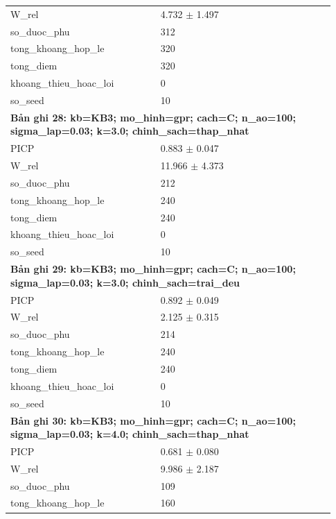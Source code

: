 \begin{longtable}{p{0.43\linewidth}p{0.50\linewidth}}
W\_\allowbreak rel & 4.732 $\pm$ 1.497 \\
so\_\allowbreak duoc\_\allowbreak phu & 312 \\
tong\_\allowbreak khoang\_\allowbreak hop\_\allowbreak le & 320 \\
tong\_\allowbreak diem & 320 \\
khoang\_\allowbreak thieu\_\allowbreak hoac\_\allowbreak loi & 0 \\
so\_\allowbreak seed & 10 \\
\midrule
\multicolumn{2}{p{0.95\linewidth}}{\textbf{Bản ghi 28: kb=KB3; mo\_hinh=gpr; cach=C; n\_ao=100; sigma\_lap=0.03; k=3.0; chinh\_sach=thap\_nhat}} \\
PICP & 0.883 $\pm$ 0.047 \\
W\_\allowbreak rel & 11.966 $\pm$ 4.373 \\
so\_\allowbreak duoc\_\allowbreak phu & 212 \\
tong\_\allowbreak khoang\_\allowbreak hop\_\allowbreak le & 240 \\
tong\_\allowbreak diem & 240 \\
khoang\_\allowbreak thieu\_\allowbreak hoac\_\allowbreak loi & 0 \\
so\_\allowbreak seed & 10 \\
\midrule
\multicolumn{2}{p{0.95\linewidth}}{\textbf{Bản ghi 29: kb=KB3; mo\_hinh=gpr; cach=C; n\_ao=100; sigma\_lap=0.03; k=3.0; chinh\_sach=trai\_deu}} \\
PICP & 0.892 $\pm$ 0.049 \\
W\_\allowbreak rel & 2.125 $\pm$ 0.315 \\
so\_\allowbreak duoc\_\allowbreak phu & 214 \\
tong\_\allowbreak khoang\_\allowbreak hop\_\allowbreak le & 240 \\
tong\_\allowbreak diem & 240 \\
khoang\_\allowbreak thieu\_\allowbreak hoac\_\allowbreak loi & 0 \\
so\_\allowbreak seed & 10 \\
\midrule
\multicolumn{2}{p{0.95\linewidth}}{\textbf{Bản ghi 30: kb=KB3; mo\_hinh=gpr; cach=C; n\_ao=100; sigma\_lap=0.03; k=4.0; chinh\_sach=thap\_nhat}} \\
PICP & 0.681 $\pm$ 0.080 \\
W\_\allowbreak rel & 9.986 $\pm$ 2.187 \\
so\_\allowbreak duoc\_\allowbreak phu & 109 \\
tong\_\allowbreak khoang\_\allowbreak hop\_\allowbreak le & 160 \\

\end{longtable}
